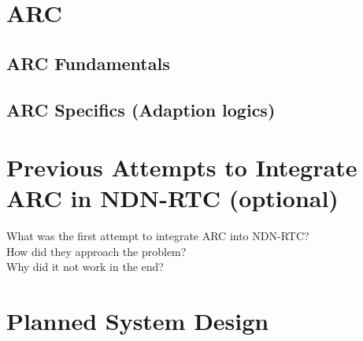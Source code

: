 \section{ARC}


\subsection{ARC Fundamentals}


\subsection{ARC Specifics (Adaption logics)}


\section{Previous Attempts to Integrate ARC in NDN-RTC (optional)}
What was the first attempt to integrate ARC into NDN-RTC? \\
How did they approach the problem? \\
Why did it not work in the end? \\

\section{Planned System Design}

